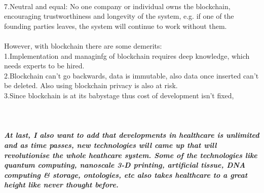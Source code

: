 \documentclass[12pt]{article}
\begin{document}
{    \\ 7.Neutral and equal: No one company or individual owns the blockchain, encouraging trustworthiness and longevity of the system, e.g. if one of the founding parties leaves, the system will continue to work without them.
    \\\\However, with blockchain there are some demerits:
    \\ 1.Implementation and managinfg of blockchain requires deep knowledge, which needs experts to be hired.
    \\ 2.Blockchain can't go backwards, data is immutable, also data once inserted can't be deleted. Also using blockchain privacy is also at risk.
    \\ 3.Since blockchain is at its babystage thus cost of development isn't fixed,}
    \paragraph{\textit{\\\\At last, I also want to add that developments in healthcare is unlimited and as time passes, new technologies will came up that will revolutionise the whole heathcare system. Some of the technologies like quantum computing, nanoscale 3-D printing, artificial tissue, DNA computing \& storage, ontologies,  etc also takes healthcare to a great height like never thought before.}}
\end{document}
